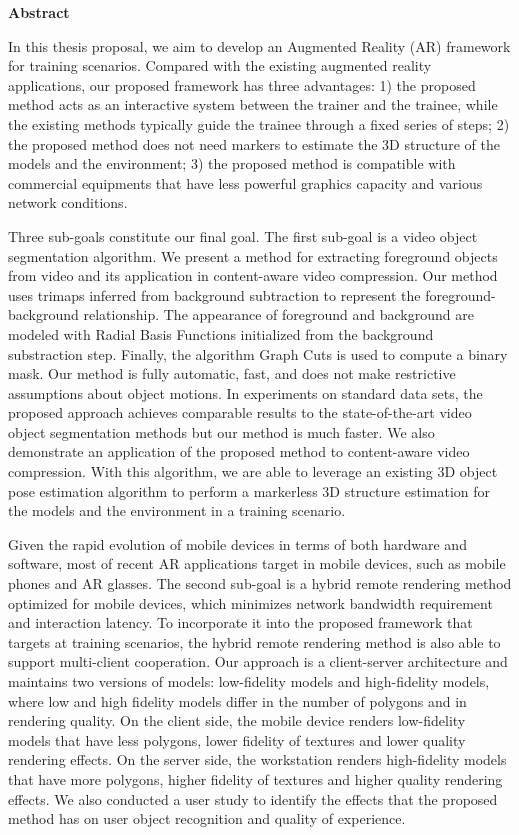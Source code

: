 
\begin{center}\textbf{Abstract}\end{center}

In this thesis proposal, we aim to develop an Augmented Reality (AR) framework for training scenarios.
Compared with the existing augmented reality applications, our proposed framework has three advantages: 1) the proposed method acts as an interactive system between the trainer and the trainee, while the existing methods typically guide the trainee through a fixed series of steps; 2) the proposed method does not need markers to estimate the 3D structure of the models and the environment; 3) the proposed method is compatible with commercial equipments that have less powerful graphics capacity and various network conditions.

Three sub-goals constitute our final goal.
The first sub-goal is a video object segmentation algorithm.
We present a method for extracting foreground objects from video and its application in content-aware video compression. Our method uses trimaps inferred from background subtraction to represent the foreground-background relationship. The appearance of foreground and background are modeled with Radial Basis Functions initialized from the background substraction step. Finally, the algorithm Graph Cuts is used to compute a binary mask. Our method is fully automatic, fast, and does not make restrictive assumptions about object motions. In experiments on standard data sets, the proposed approach achieves comparable results to the state-of-the-art video object segmentation methods but our method is much faster. We also demonstrate an application of the proposed method to content-aware video compression.
With this algorithm, we are able to leverage an existing 3D object pose estimation algorithm to perform a markerless 3D structure estimation for the models and the environment in a training scenario.

Given the rapid evolution of mobile devices in terms of both hardware and software, most of recent AR applications target in mobile devices, such as mobile phones and AR glasses.
The second sub-goal is a hybrid remote rendering method optimized for mobile devices, which minimizes network bandwidth requirement and interaction latency. To incorporate it into the proposed framework that targets at training scenarios, the hybrid remote rendering method is also able to support multi-client cooperation.
Our approach is a client-server architecture and maintains two versions of models: low-fidelity models and high-fidelity models, where low and high fidelity models differ in the number of polygons and in rendering quality.
On the client side, the mobile device renders low-fidelity models that have less polygons, lower fidelity of textures and lower quality rendering effects. On the server side, the workstation renders high-fidelity models that have more polygons, higher fidelity of textures and higher quality rendering effects.
We also conducted a user study to identify the effects that the proposed method has on user object recognition and quality of experience.

